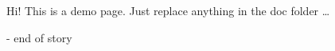 \documentclass[12pt,a4paper]{report}
\begin{document}
\begin{center}
    \huge{Hi! This is a demo page. Just replace anything in the doc folder \ldots}
    \vspace{50mm}
    \break{}
    
    \vspace{50mm}
    \break{}
    \huge{- end of story}
\end{center}
\end{document}
